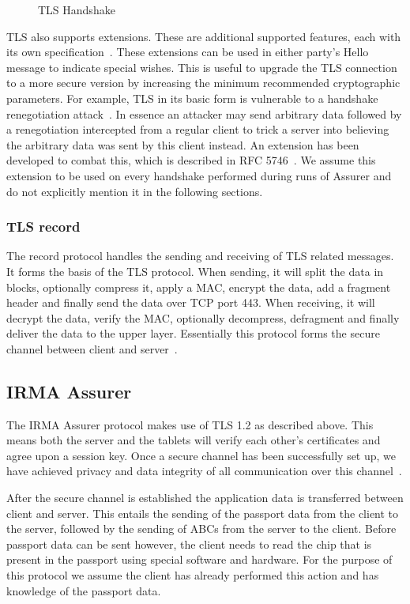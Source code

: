 \begin{figure}[htb]
\centering
\theverbbox
\caption{TLS Handshake}
\label{fig:tlshandshake}
\end{figure}

TLS also supports extensions. These are additional supported features, each with its own specification~\cite{tlsext}. These extensions can be used in either party's Hello message to indicate special wishes. This is useful to upgrade the TLS connection to a more secure version by increasing the minimum recommended cryptographic parameters. For example, TLS in its basic form is vulnerable to a handshake renegotiation attack~\cite{lecture}. In essence an attacker may send arbitrary data followed by a renegotiation intercepted from a regular client to trick a server into believing the arbitrary data was sent by this client instead. An extension has been developed to combat this, which is described in RFC 5746~\cite{tls_handshake_vuln}. We assume this extension to be used on every handshake performed during runs of Assurer and do not explicitly mention it in the following sections.

\subsubsection{TLS record}
The record protocol handles the sending and receiving of TLS related messages. It forms the basis of the TLS protocol. When sending, it will split the data in blocks, optionally compress it, apply a MAC, encrypt the data, add a fragment header and finally send the data over TCP port 443. When receiving, it will decrypt the data, verify the MAC, optionally decompress, defragment and finally deliver the data to the upper layer. Essentially this protocol forms the secure channel between client and server~\cite{tls1.2}.

\subsection{IRMA Assurer}
The IRMA Assurer protocol makes use of TLS 1.2 as described above. This means both the server and the tablets will verify each other's certificates and agree upon a session key. Once a secure channel has been successfully set up, we have achieved privacy and data integrity of all communication over this channel~\cite{tls1.2}.

After the secure channel is established the application data is transferred between client and server. This entails the sending of the passport data from the client to the server, followed by the sending of ABCs from the server to the client. Before passport data can be sent however, the client needs to read the chip that is present in the passport using special software and hardware. For the purpose of this protocol we assume the client has already performed this action and has knowledge of the passport data.


